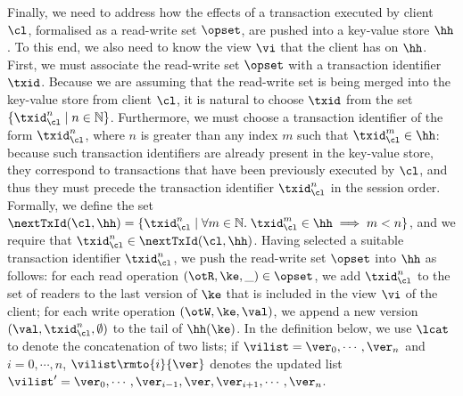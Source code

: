 Finally, we need to address how the effects of a transaction executed by client $\cl$, formalised 
as a read-write set $\opset$, are pushed into a key-value store $\hh$. To this end, we also 
need to know the view $\vi$ that the client has on $\hh$.
First, we must associate the read-write set $\opset$ with a transaction identifier $\txid$.  
Because we are assuming that the read-write set is being merged into the key-value store from client $\cl$, 
it is natural to choose $\txid$ from the set $\{\txid_{\cl}^{n} \mid n \in \mathbb{N}\}$. 
Furthermore, we must choose a transaction identifier of the form 
$\txid_{\cl}^{n}$, where $n$ is greater than any index $m$ such that 
$\txid_{\cl}^{m} \in \hh$: because such transaction identifiers are already present 
in the key-value store, they correspond to transactions that have been previously executed 
by $\cl$, and thus they must precede the transaction identifier $\txid_{\cl}^{n}$ in the session 
order. Formally, we define the set $\nextTxId(\cl, \hh) = \{ \txid_{\cl}^{n} \mid \forall m \in \mathbb{N}. \; 
\txid_{\cl}^{m} \in \hh \implies m < n\}$, and we require that $\txid_{\cl}^{n} \in \nextTxId(\cl,\hh)$. 
Having selected a suitable transaction identifier $\txid_{\cl}^{n}$, we push the read-write set $\opset$ 
into $\hh$ as follows: for each read operation $(\otR, \ke, \_) \in \opset$, we add $\txid_{\cl}^{n}$ 
to the set of readers to the last version of $\ke$ that is included in the view $\vi$ of the client; 
for each write operation $(\otW, \ke, \val)$, we append a new version $(\val, \txid_{\cl}^{n}, \emptyset)$ 
to the tail of $\hh(\ke)$.
In the definition below, we use $\lcat$ to denote the concatenation of two lists; 
if $\vilist = \ver_0, \cdots, \ver_n$ and $i=0,\cdots,n$, 
$\vilist\rmto{i}{\ver}$ denotes the updated list 
$\vilist' = \ver_0, \cdots, \ver_{i-1}, \ver, \ver_{i+1}, \cdots, \ver_{n}$. 

